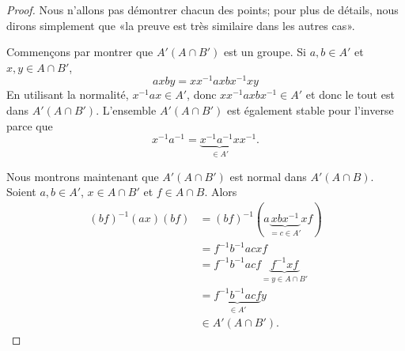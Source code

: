 \begin{proof}
	Nous n'allons pas démontrer chacun des points; pour plus de détails, nous dirons simplement que «la preuve est très similaire dans les autres cas».

	Commençons par montrer que \( A'(A\cap B')\) est un groupe. Si \( a,b\in A'\) et \( x,y\in A\cap B'\),
	\begin{equation}
		axby=xx^{-1}axbx^{-1}xy
	\end{equation}
	En utilisant la normalité, \( x^{-1}ax\in A'\), donc \( xx^{-1}axbx^{-1}\in A'\) et donc le tout est dans \( A'(A\cap B')\). L'ensemble \( A'(A\cap B')\) est également stable pour l'inverse parce que
	\begin{equation}
		x^{-1}a^{-1}=\underbrace{x^{-1}a^{-1}x}_{\in A'}x^{-1}.
	\end{equation}

	Nous montrons maintenant que \( A'(A\cap B')\) est normal dans \( A'(A\cap B)\). Soient \( a,b\in A'\), \( x\in A\cap B'\) et \( f\in A\cap B\). Alors
	\begin{subequations}
		\begin{align}
			(bf)^{-1}(ax)(bf) & =(bf)^{-1}(a\underbrace{xbx^{-1}}_{=c\in A'}xf)        \\
			                  & =f^{-1}b^{-1}acxf                                      \\
			                  & =f^{-1}b^{-1}acf\underbrace{f^{-1}xf}_{=y\in A\cap B'} \\
			                  & =\underbrace{f^{-1}b^{-1}acf}_{\in A'}y                \\
			                  & \in A'(A\cap B').
		\end{align}
	\end{subequations}


\end{proof}
